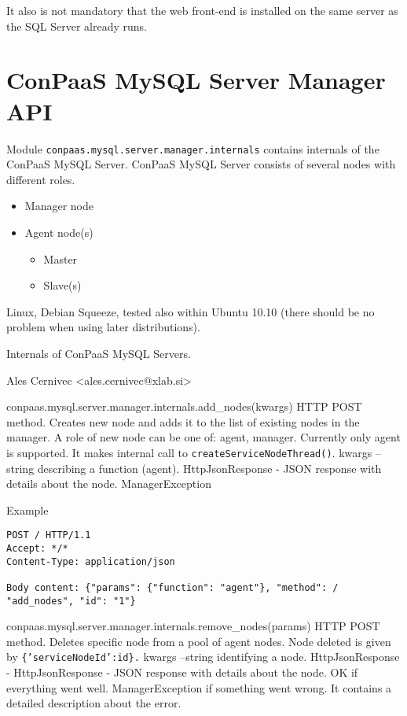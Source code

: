 \documentclass[a4paper,10pt]{article}
\begin{document}
It also is not mandatory that the web front-end is installed on the same server as the SQL Server already runs. 

\section{ConPaaS MySQL Server Manager API}

Module {\tt conpaas.mysql.server.manager.internals} contains internals of the ConPaaS MySQL Server. ConPaaS MySQL Server consists of several nodes with different roles.

\begin{itemize}
	\item Manager node
	\item Agent node(s)
	\begin{itemize}
		\item Master
		\item Slave(s)
	\end{itemize}	
\end{itemize}

Linux, Debian Squeeze, tested also within Ubuntu 10.10 (there should be no problem when using later distributions).

Internals of ConPaaS MySQL Servers.

Ales Cernivec <ales.cernivec@xlab.si>
      
\vspace{10pt}

\noindent\conapi
{conpaas.mysql.server.manager.internals.add\_nodes(kwargs)}
{HTTP POST method. Creates new node and adds it to the list of existing nodes in the manager. A role of new node can be one of: agent, manager. Currently only agent is supported. It makes internal call to {\tt createServiceNodeThread()}.}
{kwargs -- string describing a function (agent).}
{HttpJsonResponse - JSON response with details about the node.}
{ManagerException}

Example
\begin{Verbatim}[frame=single]
POST / HTTP/1.1
Accept: */*
Content-Type: application/json

Body content: {"params": {"function": "agent"}, "method": /
"add_nodes", "id": "1"}
\end{Verbatim}

\noindent\conapi
{ conpaas.mysql.server.manager.internals.remove\_nodes(params)}
{HTTP POST method. Deletes specific node from a pool of agent nodes. Node deleted is given by {\tt \{'serviceNodeId':id\}.}}
{kwargs --string identifying a node.}
{HttpJsonResponse - HttpJsonResponse - JSON response with details about the node. OK if everything went well. }
{ManagerException if something went wrong. It contains a detailed description about the error.}
\end{document}
